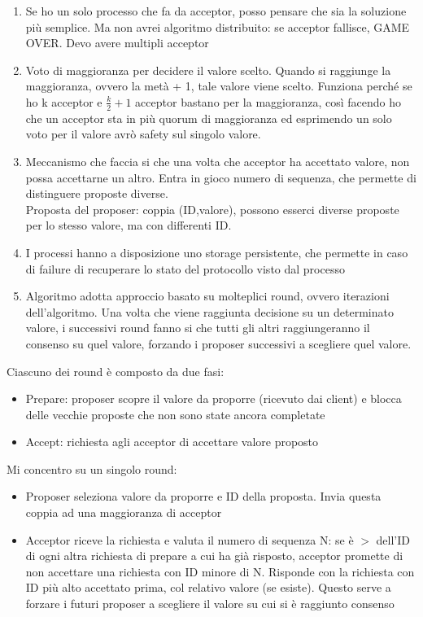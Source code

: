 \documentclass{article}
\begin{document}
\begin{enumerate}
\item Se ho un solo processo che fa da acceptor, posso pensare che sia la soluzione più semplice. Ma non avrei algoritmo distribuito: se acceptor fallisce, GAME OVER. Devo avere multipli acceptor
\item Voto di maggioranza per decidere il valore scelto. Quando si raggiunge la maggioranza, ovvero la metà + 1, tale valore viene scelto. Funziona perché se ho k acceptor e $\frac{k}{2} + 1$ acceptor bastano per la maggioranza, così facendo ho che un acceptor sta in più quorum di maggioranza ed esprimendo un solo voto per il valore avrò safety sul singolo valore.
\item Meccanismo che faccia si che una volta che acceptor ha accettato valore, non possa accettarne un altro. Entra in gioco numero di sequenza, che permette di distinguere proposte diverse.\\ Proposta del proposer: coppia (ID,valore), possono esserci diverse proposte per lo stesso valore, ma con differenti ID.
\item I processi hanno a disposizione uno storage persistente, che permette in caso di failure di recuperare lo stato del protocollo visto dal processo
\item Algoritmo adotta approccio basato su molteplici round, ovvero iterazioni dell'algoritmo. Una volta che viene raggiunta decisione su un determinato valore, i successivi round fanno si che tutti gli altri raggiungeranno il consenso su quel valore, forzando i proposer successivi a scegliere quel valore.
\end{enumerate}
Ciascuno dei round è composto da due fasi:
\begin{itemize}
\item Prepare: proposer scopre il valore da proporre (ricevuto dai client) e blocca delle vecchie proposte che non sono state ancora completate
\item Accept: richiesta agli acceptor di accettare valore proposto
\end{itemize}
Mi concentro su un singolo round:
\begin{itemize}
\item Proposer seleziona valore da proporre e ID della proposta. Invia questa coppia ad una maggioranza di acceptor
\item Acceptor riceve la richiesta e valuta il numero di sequenza N: se è $>$ dell'ID di ogni altra richiesta di prepare a cui ha già risposto, acceptor promette di non accettare una richiesta con ID minore di N. Risponde con la richiesta con ID più alto accettato prima, col relativo valore (se esiste). Questo serve a forzare i futuri proposer a scegliere il valore su cui si è raggiunto consenso
\end{itemize}
\end{document}
